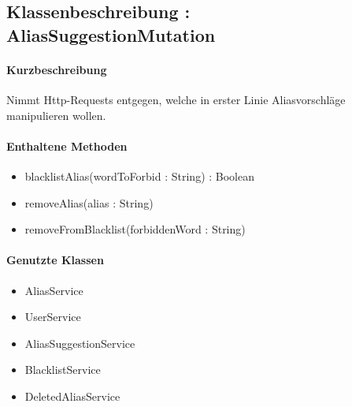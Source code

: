 \subsection{Klassenbeschreibung : AliasSuggestionMutation}%
\paragraph*{Kurzbeschreibung}
Nimmt Http-Requests entgegen, welche in erster Linie Aliasvorschläge manipulieren wollen.
\paragraph*{Enthaltene Methoden}
\begin{itemize}
    \item blacklistAlias(wordToForbid : String) : Boolean
    \item removeAlias(alias : String)
    \item removeFromBlacklist(forbiddenWord : String)
\end{itemize}
\paragraph*{Genutzte Klassen}
\begin{itemize}
    \item AliasService
    \item UserService
    \item AliasSuggestionService
    \item BlacklistService
    \item DeletedAliasService
\end{itemize}
